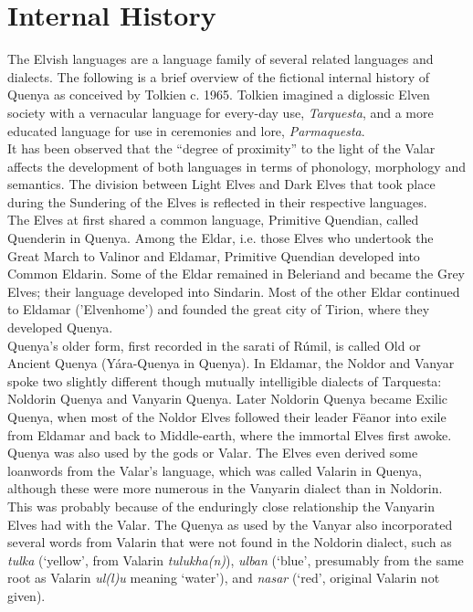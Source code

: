 \documentclass[pub]{apa6}
\begin{document}
\section{Internal History}
The Elvish languages are a language family of several related languages and dialects. The following is a brief
overview of the fictional internal history of Quenya as conceived by Tolkien c. 1965. Tolkien imagined a diglossic Elven society with a vernacular language for every-day use, {\it Tarquesta}, and a more educated language for use in ceremonies and lore, {\it Parmaquesta}.\\
\indent It has been observed that the ``degree of proximity'' to the light of the Valar affects the development of both languages in terms of phonology, morphology and semantics. The division between Light Elves and Dark Elves that took place during the Sundering of the Elves is reflected in their respective languages.\\
\indent The Elves at first shared a common language, Primitive Quendian, called Quenderin in Quenya. Among the Eldar, i.e. those Elves who undertook the Great March to Valinor and Eldamar, Primitive Quendian developed into Common Eldarin. Some of the Eldar remained in Beleriand and became the Grey Elves; their language developed into Sindarin. Most of the other Eldar continued to Eldamar ('Elvenhome') and founded the great city of Tirion, where they developed Quenya.\\
\indent Quenya's older form, first recorded in the sarati of R\'umil, is called Old or Ancient Quenya (Y\'ara-Quenya in Quenya). In Eldamar, the Noldor and Vanyar spoke two slightly different though mutually intelligible dialects of Tarquesta: Noldorin Quenya and Vanyarin Quenya. Later Noldorin Quenya became Exilic Quenya, when most of the Noldor Elves followed their leader F\"eanor into exile from Eldamar and back to Middle-earth, where the immortal Elves first awoke.\\
\indent Quenya was also used by the gods or Valar. The Elves even derived some loanwords from the Valar's language, which was called Valarin in Quenya, although these were more numerous in the Vanyarin dialect than in Noldorin. This was probably because of the enduringly close relationship the Vanyarin Elves had with the Valar. The Quenya as used by the Vanyar also incorporated several words from Valarin that were not found in the Noldorin dialect, such as {\it tulka} (`yellow', from Valarin {\it tulukha(n)}), {\it ulban} (`blue', presumably from the same root as Valarin {\it ul(l)u} meaning `water'), and {\it nasar} (`red', original Valarin not given).\\
\end{document}
